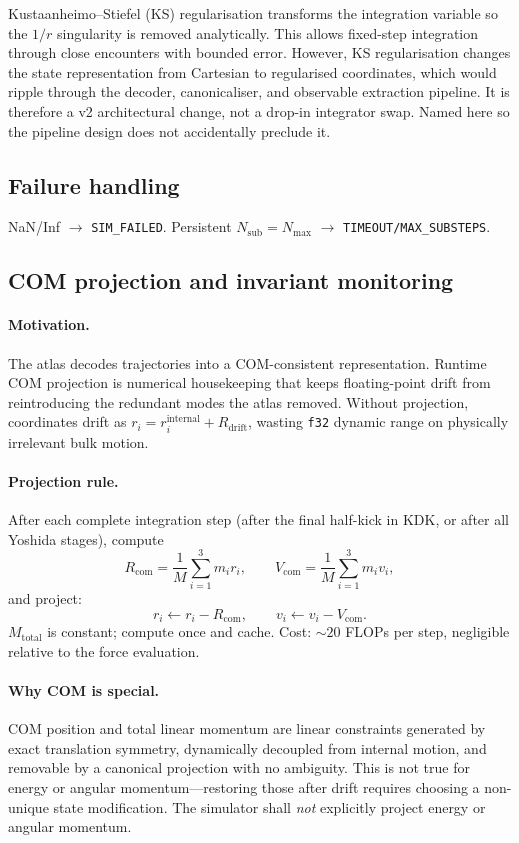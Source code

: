 \documentclass[11pt]{report}
\begin{document}
Kustaanheimo--Stiefel (KS) regularisation transforms the integration variable so the $1/r$ singularity is removed analytically. This allows fixed-step integration through close encounters with bounded error. However, KS regularisation changes the state representation from Cartesian to regularised coordinates, which would ripple through the decoder, canonicaliser, and observable extraction pipeline. It is therefore a v2 architectural change, not a drop-in integrator swap. Named here so the pipeline design does not accidentally preclude it.

\subsection{Failure handling}

NaN/Inf $\to$ \texttt{SIM\_FAILED}. Persistent $N_{\text{sub}}=N_{\max}$ $\to$ \texttt{TIMEOUT/MAX\_SUBSTEPS}.

\subsection{COM projection and invariant monitoring}
\label{sec:com_projection}

\paragraph{Motivation.} The atlas decodes trajectories into a COM-consistent representation. Runtime COM projection is numerical housekeeping that keeps floating-point drift from reintroducing the redundant modes the atlas removed. Without projection, coordinates drift as $r_i = r_i^{\text{internal}} + R_{\text{drift}}$, wasting \texttt{f32} dynamic range on physically irrelevant bulk motion.

\paragraph{Projection rule.} After each complete integration step (after the final half-kick in KDK, or after all Yoshida stages), compute
\[
R_{\text{com}} = \frac{1}{M}\sum_{i=1}^{3} m_i r_i, \qquad V_{\text{com}} = \frac{1}{M}\sum_{i=1}^{3} m_i v_i,
\]
and project:
\[
r_i \leftarrow r_i - R_{\text{com}}, \qquad v_i \leftarrow v_i - V_{\text{com}}.
\]
$M_{\text{total}}$ is constant; compute once and cache. Cost: $\sim 20$ FLOPs per step, negligible relative to the force evaluation.

\paragraph{Why COM is special.} COM position and total linear momentum are linear constraints generated by exact translation symmetry, dynamically decoupled from internal motion, and removable by a canonical projection with no ambiguity. This is not true for energy or angular momentum---restoring those after drift requires choosing a non-unique state modification. The simulator shall \emph{not} explicitly project energy or angular momentum.
\end{document}
